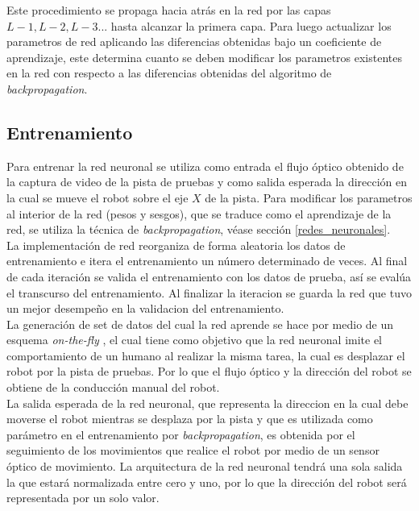 \documentclass{iccmemoria}
\begin{document}
Este procedimiento se propaga hacia atrás en la red por las capas $L-1, L-2, L-3...$ hasta alcanzar la primera capa. Para luego actualizar los parametros de red aplicando las diferencias obtenidas bajo un coeficiente de aprendizaje, este determina cuanto se deben modificar los parametros existentes en la red con respecto a las diferencias obtenidas del algoritmo de \emph{backpropagation}.


\subsection{Entrenamiento}

Para entrenar la red neuronal se utiliza como entrada el flujo óptico obtenido de la captura de video de la pista de pruebas y como salida esperada la dirección en la cual se mueve el robot sobre el eje $X$ de la pista. Para modificar los parametros al interior de la red (pesos y sesgos), que se traduce como el aprendizaje de la red, se utiliza la técnica de \emph{backpropagation}, véase sección \ref{redes_neuronales}.\\

La implementación de red reorganiza de forma aleatoria los datos de entrenamiento e itera el entrenamiento un número determinado de veces. Al final de cada iteración se valida el entrenamiento con los datos de prueba, así se evalúa el transcurso del entrenamiento. Al finalizar la iteracion se guarda la red que tuvo un mejor desempeño en la validacion del entrenamiento.\\

La generación de set de datos del cual la red aprende se hace por medio de un esquema \emph{on-the-fly} \cite{pomerleau1989alvinn}, el cual tiene como objetivo que la red neuronal imite el comportamiento de un humano al realizar la misma tarea, la cual es desplazar el robot por la pista de pruebas. Por lo que el flujo óptico y la dirección del robot se obtiene de la conducción manual del robot.\\

La salida esperada de la red neuronal, que representa la direccion en la cual debe moverse el robot mientras se desplaza por la pista y que es utilizada como parámetro en el entrenamiento por \emph{backpropagation}, es obtenida por el seguimiento de los movimientos que realice el robot por medio de un sensor óptico de movimiento. La arquitectura de la red neuronal tendrá una sola salida la que estará normalizada entre cero y uno, por lo que la dirección del robot será representada por un solo valor.\\
\end{document}
